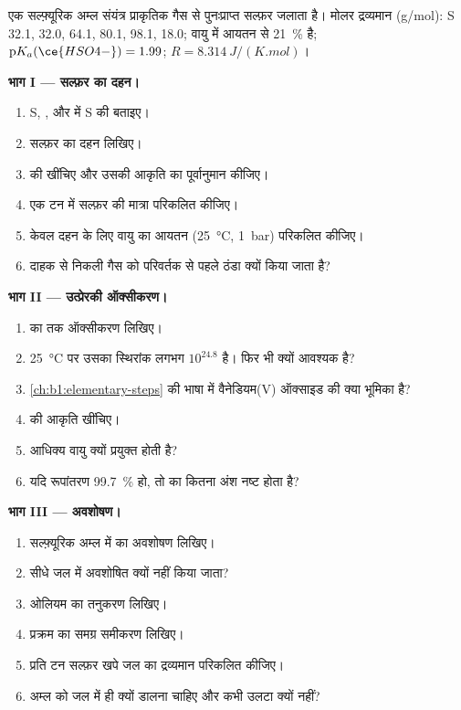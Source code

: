 \begin{problem}
\label{pb:b1:p-block-16-18:1}
एक सल्फ़्यूरिक अम्ल संयंत्र प्राकृतिक गैस से पुनःप्राप्त सल्फ़र जलाता है। मोलर द्रव्यमान
(\unit{g/mol}): S 32.1,  32.0,  64.1,  80.1,
 98.1,  18.0; वायु में आयतन से \qty{21}{\percent}
 है; $\mathrm{p}K_a(\ce{HSO4-}) = 1.99$; $R =
\qty{8.314}{J/(K.mol)}$।

\medskip
\noindent\textbf{भाग I --- सल्फ़र का दहन।}
\begin{enumerate}
  \item S, ,  और
         में S की  बताइए।
  \item सल्फ़र का दहन लिखिए।
  \item {} की  खींचिए और उसकी आकृति का पूर्वानुमान कीजिए।
  \item एक टन में सल्फ़र की मात्रा परिकलित कीजिए।
  \item केवल दहन के लिए वायु का आयतन (\qty{25}{\celsius}, \qty{1}{bar})
        परिकलित कीजिए।
  \item दाहक से निकली गैस को परिवर्तक से पहले ठंडा क्यों किया जाता है?
\end{enumerate}

\medskip
\noindent\textbf{भाग II --- उत्प्रेरकी ऑक्सीकरण।}
\begin{enumerate}[resume]
  \item {} का  तक ऑक्सीकरण लिखिए।
  \item \qty{25}{\celsius} पर उसका स्थिरांक लगभग $10^{24.8}$ है। फिर भी
         क्यों आवश्यक है?
  \item \cref{ch:b1:elementary-steps} की भाषा में वैनेडियम(V) ऑक्साइड की क्या भूमिका
        है?
  \item {} की आकृति खींचिए।
  \item आधिक्य वायु क्यों प्रयुक्त होती है?
  \item यदि रूपांतरण \qty{99.7}{\percent} हो, तो  का कितना अंश
        नष्ट होता है?
\end{enumerate}

\medskip
\noindent\textbf{भाग III --- अवशोषण।}
\begin{enumerate}[resume]
  \item सल्फ़्यूरिक अम्ल में  का अवशोषण लिखिए।
  \item {} सीधे जल में अवशोषित क्यों नहीं किया जाता?
  \item ओलियम का तनुकरण लिखिए।
  \item प्रक्रम का समग्र समीकरण लिखिए।
  \item प्रति टन सल्फ़र खपे जल का द्रव्यमान परिकलित कीजिए।
  \item अम्ल को जल में ही क्यों डालना चाहिए और कभी उलटा क्यों नहीं?
\end{enumerate}


\end{problem}
